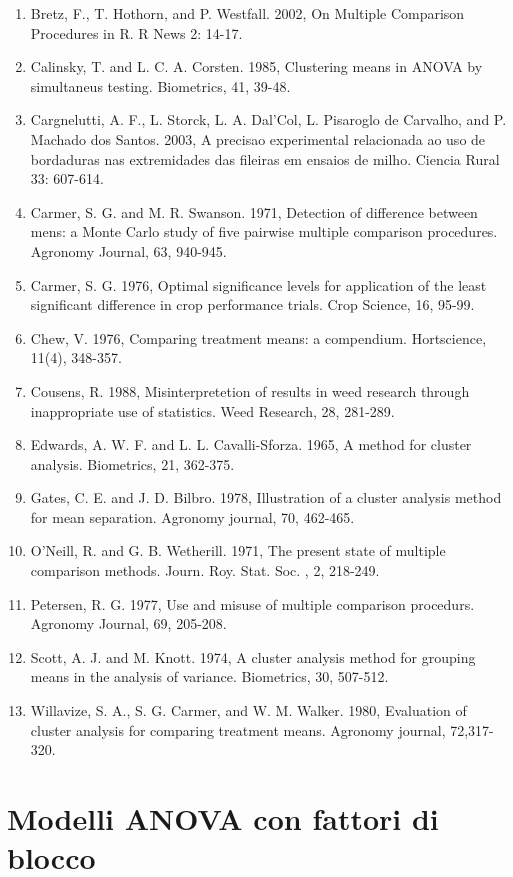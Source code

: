 \documentclass[a4paper,12pt,oneside]{book}
\providecommand{\tightlist}{%
  \setlength{\itemsep}{0pt}\setlength{\parskip}{0pt}}
\begin{document}
\begin{enumerate}
\def\labelenumi{\arabic{enumi}.}
\tightlist
\item
  Bretz, F., T. Hothorn, and P. Westfall. 2002, On Multiple Comparison Procedures in R. R News 2: 14-17.
\item
  Calinsky, T. and L. C. A. Corsten. 1985, Clustering means in ANOVA by simultaneus testing. Biometrics, 41, 39-48.
\item
  Cargnelutti, A. F., L. Storck, L. A. Dal'Col, L. Pisaroglo de Carvalho, and P. Machado dos Santos. 2003, A precisao experimental relacionada ao uso de bordaduras nas extremidades das fileiras em ensaios de milho. Ciencia Rural 33: 607-614.
\item
  Carmer, S. G. and M. R. Swanson. 1971, Detection of difference between mens: a Monte Carlo study of five pairwise multiple comparison procedures. Agronomy Journal, 63, 940-945.
\item
  Carmer, S. G. 1976, Optimal significance levels for application of the least significant difference in crop performance trials. Crop Science, 16, 95-99.
\item
  Chew, V. 1976, Comparing treatment means: a compendium. Hortscience, 11(4), 348-357.
\item
  Cousens, R. 1988, Misinterpretetion of results in weed research through inappropriate use of statistics. Weed Research, 28, 281-289.
\item
  Edwards, A. W. F. and L. L. Cavalli-Sforza. 1965, A method for cluster analysis. Biometrics, 21, 362-375.
\item
  Gates, C. E. and J. D. Bilbro. 1978, Illustration of a cluster analysis method for mean separation. Agronomy journal, 70, 462-465.
\item
  O'Neill, R. and G. B. Wetherill. 1971, The present state of multiple comparison methods. Journ. Roy. Stat. Soc. , 2, 218-249.
\item
  Petersen, R. G. 1977, Use and misuse of multiple comparison procedurs. Agronomy Journal, 69, 205-208.
\item
  Scott, A. J. and M. Knott. 1974, A cluster analysis method for grouping means in the analysis of variance. Biometrics, 30, 507-512.
\item
  Willavize, S. A., S. G. Carmer, and W. M. Walker. 1980, Evaluation of cluster analysis for comparing treatment means. Agronomy journal, 72,317-320.
\end{enumerate}

\hypertarget{modelli-anova-con-fattori-di-blocco}{%
\chapter{Modelli ANOVA con fattori di blocco}\label{modelli-anova-con-fattori-di-blocco}}
\end{document}
